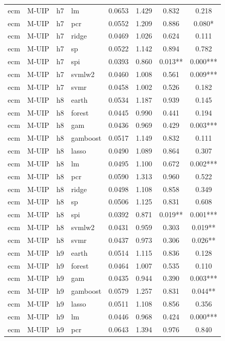 \begin{ThreePartTable}
\begin{longtable}[t]{llclcccc}
ecm & M-UIP & h7 & lm & 0.0653 & 1.429 & 0.832 & 0.218\\
ecm & M-UIP & h7 & pcr & 0.0552 & 1.209 & 0.886 & 0.080*\\
ecm & M-UIP & h7 & ridge & 0.0469 & 1.026 & 0.624 & 0.111\\
ecm & M-UIP & h7 & sp & 0.0522 & 1.142 & 0.894 & 0.782\\
ecm & M-UIP & h7 & spi & 0.0393 & 0.860 & 0.013** & 0.000***\\
ecm & M-UIP & h7 & svmlw2 & 0.0460 & 1.008 & 0.561 & 0.009***\\
ecm & M-UIP & h7 & svmr & 0.0458 & 1.002 & 0.526 & 0.182\\
\addlinespace
ecm & M-UIP & h8 & earth & 0.0534 & 1.187 & 0.939 & 0.145\\
ecm & M-UIP & h8 & forest & 0.0445 & 0.990 & 0.441 & 0.194\\
ecm & M-UIP & h8 & gam & 0.0436 & 0.969 & 0.429 & 0.003***\\
ecm & M-UIP & h8 & gamboost & 0.0517 & 1.149 & 0.832 & 0.111\\
ecm & M-UIP & h8 & lasso & 0.0490 & 1.089 & 0.864 & 0.307\\
ecm & M-UIP & h8 & lm & 0.0495 & 1.100 & 0.672 & 0.002***\\
ecm & M-UIP & h8 & pcr & 0.0590 & 1.313 & 0.960 & 0.522\\
ecm & M-UIP & h8 & ridge & 0.0498 & 1.108 & 0.858 & 0.349\\
ecm & M-UIP & h8 & sp & 0.0506 & 1.125 & 0.831 & 0.608\\
ecm & M-UIP & h8 & spi & 0.0392 & 0.871 & 0.019** & 0.001***\\
ecm & M-UIP & h8 & svmlw2 & 0.0431 & 0.959 & 0.303 & 0.019**\\
ecm & M-UIP & h8 & svmr & 0.0437 & 0.973 & 0.306 & 0.026**\\
\addlinespace
ecm & M-UIP & h9 & earth & 0.0514 & 1.115 & 0.836 & 0.128\\
ecm & M-UIP & h9 & forest & 0.0464 & 1.007 & 0.535 & 0.110\\
ecm & M-UIP & h9 & gam & 0.0435 & 0.944 & 0.390 & 0.003***\\
ecm & M-UIP & h9 & gamboost & 0.0579 & 1.257 & 0.831 & 0.044**\\
ecm & M-UIP & h9 & lasso & 0.0511 & 1.108 & 0.856 & 0.356\\
ecm & M-UIP & h9 & lm & 0.0446 & 0.968 & 0.424 & 0.000***\\
ecm & M-UIP & h9 & pcr & 0.0643 & 1.394 & 0.976 & 0.840\\

\end{longtable}
\end{ThreePartTable}
